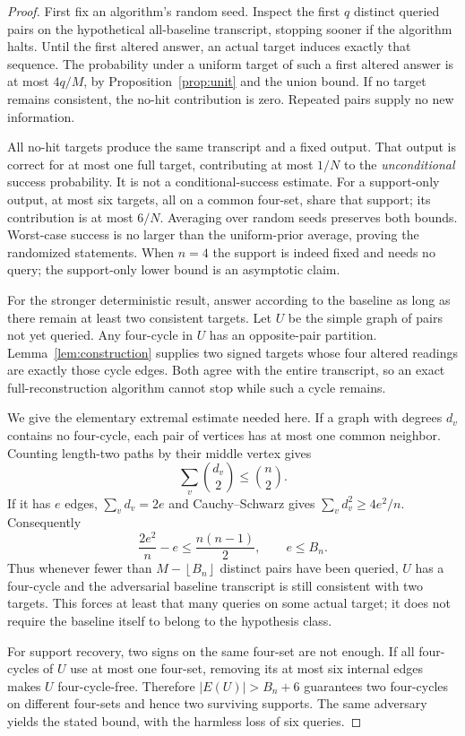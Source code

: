 \documentclass[11pt,letterpaper]{article}
\newcommand{\floor}[1]{\left\lfloor #1\right\rfloor}
\begin{document}
\begin{proof}
First fix an algorithm's random seed. Inspect the first $q$ distinct queried pairs on the hypothetical all-baseline transcript, stopping sooner if the algorithm halts. Until the first altered answer, an actual target induces exactly that sequence. The probability under a uniform target of such a first altered answer is at most $4q/M$, by Proposition~\ref{prop:unit} and the union bound. If no target remains consistent, the no-hit contribution is zero. Repeated pairs supply no new information.

All no-hit targets produce the same transcript and a fixed output. That output is correct for at most one full target, contributing at most $1/N$ to the \emph{unconditional} success probability. It is not a conditional-success estimate. For a support-only output, at most six targets, all on a common four-set, share that support; its contribution is at most $6/N$. Averaging over random seeds preserves both bounds. Worst-case success is no larger than the uniform-prior average, proving the randomized statements. When $n=4$ the support is indeed fixed and needs no query; the support-only lower bound is an asymptotic claim.

For the stronger deterministic result, answer according to the baseline as long as there remain at least two consistent targets. Let $U$ be the simple graph of pairs not yet queried. Any four-cycle in $U$ has an opposite-pair partition. Lemma~\ref{lem:construction} supplies two signed targets whose four altered readings are exactly those cycle edges. Both agree with the entire transcript, so an exact full-reconstruction algorithm cannot stop while such a cycle remains.

We give the elementary extremal estimate needed here. If a graph with degrees $d_v$ contains no four-cycle, each pair of vertices has at most one common neighbor. Counting length-two paths by their middle vertex gives
\[
 \sum_v\binom{d_v}{2}\le\binom n2.
\]
If it has $e$ edges, $\sum_vd_v=2e$ and Cauchy--Schwarz gives $\sum_vd_v^2\ge4e^2/n$. Consequently
\[
 \frac{2e^2}{n}-e\le\frac{n(n-1)}2,
 \qquad e\le B_n.
\]
Thus whenever fewer than $M-\floor{B_n}$ distinct pairs have been queried, $U$ has a four-cycle and the adversarial baseline transcript is still consistent with two targets. This forces at least that many queries on some actual target; it does not require the baseline itself to belong to the hypothesis class.

For support recovery, two signs on the same four-set are not enough. If all four-cycles of $U$ use at most one four-set, removing its at most six internal edges makes $U$ four-cycle-free. Therefore $|E(U)|>B_n+6$ guarantees two four-cycles on different four-sets and hence two surviving supports. The same adversary yields the stated bound, with the harmless loss of six queries.
\end{proof}
\end{document}
